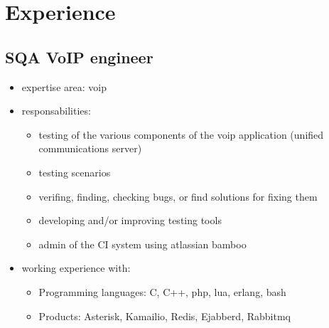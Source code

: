 \section{Experience}
	


	\subsection{SQA VoIP engineer}
		\begin{itemize}
	
			\item expertise area: voip 	
	
			\item responsabilities: 
				\begin{itemize}
					\item testing of the various components of the voip application (unified communications server) 
					\item testing scenarios 
					\item verifing, finding, checking bugs, or find solutions for fixing them
					\item developing and/or improving testing tools
					\item admin of the CI system using atlassian bamboo
				\end{itemize}
			\item working experience with:
				\begin{itemize}				
					\item Programming languages: C, C++, php, lua, erlang, bash
					\item Products: Asterisk, Kamailio, Redis, Ejabberd, Rabbitmq
				\end{itemize}

		\end{itemize}

